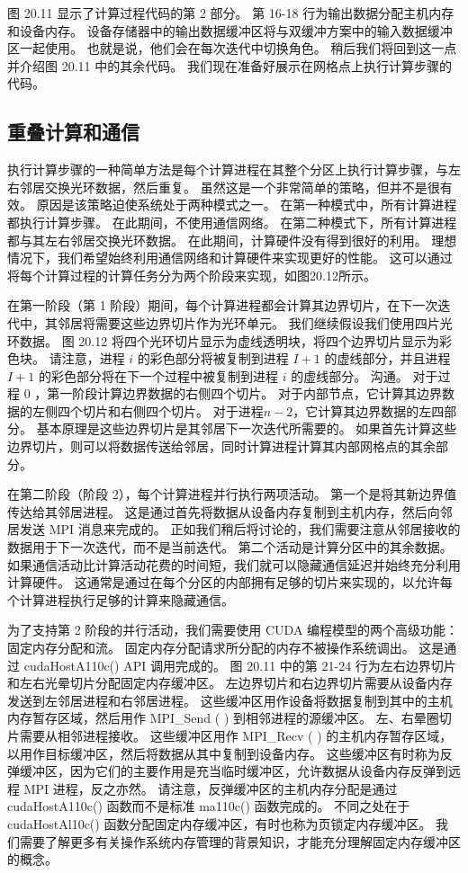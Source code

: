 图 20.11 显示了计算过程代码的第 2 部分。 第 16-18 行为输出数据分配主机内存和设备内存。 设备存储器中的输出数据缓冲区将与双缓冲方案中的输入数据缓冲区一起使用。 也就是说，他们会在每次迭代中切换角色。 稍后我们将回到这一点并介绍图 20.11 中的其余代码。 我们现在准备好展示在网格点上执行计算步骤的代码。

\subsection{重叠计算和通信}
执行计算步骤的一种简单方法是每个计算进程在其整个分区上执行计算步骤，与左右邻居交换光环数据，然后重复。 虽然这是一个非常简单的策略，但并不是很有效。 原因是该策略迫使系统处于两种模式之一。 在第一种模式中，所有计算进程都执行计算步骤。 在此期间，不使用通信网络。 在第二种模式下，所有计算进程都与其左右邻居交换光环数据。 在此期间，计算硬件没有得到很好的利用。 理想情况下，我们希望始终利用通信网络和计算硬件来实现更好的性能。 这可以通过将每个计算过程的计算任务分为两个阶段来实现，如图20.12所示。

在第一阶段（第 1 阶段）期间，每个计算进程都会计算其边界切片，在下一次迭代中，其邻居将需要这些边界切片作为光环单元。 我们继续假设我们使用四片光环数据。 图 20.12 将四个光环切片显示为虚线透明块，将四个边界切片显示为彩色块。 请注意，进程 $i$ 的彩色部分将被复制到进程 $I+1$ 的虚线部分，并且进程 $I+1$ 的彩色部分将在下一个过程中被复制到进程 $i$ 的虚线部分。 沟通。 对于过程 0 ，第一阶段计算边界数据的右侧四个切片。 对于内部节点，它计算其边界数据的左侧四个切片和右侧四个切片。 对于进程$n-2$，它计算其边界数据的左四部分。 基本原理是这些边界切片是其邻居下一次迭代所需要的。 如果首先计算这些边界切片，则可以将数据传送给邻居，同时计算进程计算其内部网格点的其余部分。

在第二阶段（阶段 2），每个计算进程并行执行两项活动。 第一个是将其新边界值传达给其邻居进程。 这是通过首先将数据从设备内存复制到主机内存，然后向邻居发送 MPI 消息来完成的。 正如我们稍后将讨论的，我们需要注意从邻居接收的数据用于下一次迭代，而不是当前迭代。 第二个活动是计算分区中的其余数据。 如果通信活动比计算活动花费的时间短，我们就可以隐藏通信延迟并始终充分利用计算硬件。 这通常是通过在每个分区的内部拥有足够的切片来实现的，以允许每个计算进程执行足够的计算来隐藏通信。

为了支持第 2 阶段的并行活动，我们需要使用 CUDA 编程模型的两个高级功能：固定内存分配和流。 固定内存分配请求所分配的内存不被操作系统调出。 这是通过 cudaHostA110c() API 调用完成的。 图 20.11 中的第 21-24 行为左右边界切片和左右光晕切片分配固定内存缓冲区。 左边界切片和右边界切片需要从设备内存发送到左邻居进程和右邻居进程。 这些缓冲区用作设备将数据复制到其中的主机内存暂存区域，然后用作 MPI\_Send ( ) 到相邻进程的源缓冲区。 左、右晕圈切片需要从相邻进程接收。 这些缓冲区用作 MPI\_Recv ( ) 的主机内存暂存区域，以用作目标缓冲区，然后将数据从其中复制到设备内存。 这些缓冲区有时称为反弹缓冲区，因为它们的主要作用是充当临时缓冲区，允许数据从设备内存反弹到远程 MPI 进程，反之亦然。 请注意，反弹缓冲区的主机内存分配是通过 cudaHostA110c() 函数而不是标准 ma110c() 函数完成的。 不同之处在于 cudaHostAl10c() 函数分配固定内存缓冲区，有时也称为页锁定内存缓冲区。 我们需要了解更多有关操作系统内存管理的背景知识，才能充分理解固定内存缓冲区的概念。


